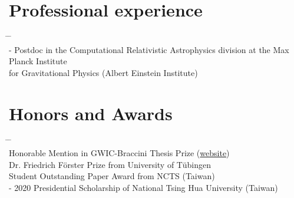 \documentclass[10pt,floatfix,a4paper]{article}
\begin{document}
\section*{Professional experience}
\begin{tabbing}
  \hspace*{5mm} \= \hspace*{2.3cm} \= \hspace*{10cm} \\[-3ex]
   - \> Postdoc in the Computational Relativistic Astrophysics division at the Max Planck Institute \\
  \> \> for Gravitational Physics (Albert Einstein Institute)
\end{tabbing}


\section*{Honors and Awards}
\begin{tabbing}
  \hspace*{5mm} \= \hspace*{2.3cm} \= \hspace*{10cm} \\[-3ex]
  \> Honorable Mention in GWIC-Braccini Thesis Prize (\href{https://gwic.ligo.org/thesis-prize.html}{website}) \\
  \> Dr. Friedrich F{\"o}rster Prize from University of T{\"u}bingen \\
  \> Student Outstanding Paper Award from NCTS (Taiwan) \\
   - 2020 \> Presidential Scholarship of National Tsing Hua University (Taiwan)
\end{tabbing}
\end{document}
